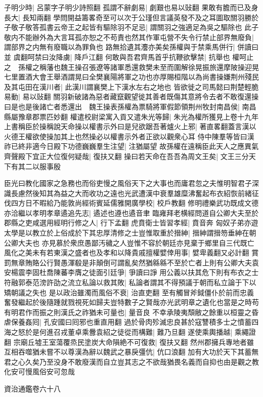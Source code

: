 子明少時|{
	呂蒙字子明少詩照翻}
孤謂不辭劇易|{
	劇艱也易以䜴翻}
果敢有膽而已及身長大|{
	長知兩翻}
學問開益籌畧奇至可以次于公瑾但言議英發不及之耳圖取關羽勝於子敬子敬答孤書云帝王之起皆有驅除羽不足忌|{
	謂關羽之強適足為吳之驅除也}
此子敬内不能辦外為大言耳孤亦恕之不苟責也然其作軍屯營不失令行禁止部界無廢負|{
	謂部界之内無有廢職以為罪負也}
路無拾遺其灋亦美矣孫權與于禁乘馬併行|{
	併讀曰並}
虞翻呵禁曰汝降虜|{
	降戶江翻}
何敢與吾君齊馬首乎抗鞭欲擊禁|{
	抗舉也}
權呵止之　孫權之稱藩也魏王操召張遼等諸軍悉還救樊未至而圍解徐晃振旅還摩陂操迎晃七里置酒大會王舉酒謂晃曰全樊襄陽將軍之功也亦厚賜桓階以為尚書操嫌荆州殘民及其屯田在漢川者|{
	此漢川謂襄樊上下漢水左右之地也}
皆欲徙之司馬懿曰荆楚輕脆易動|{
	易以䜴翻}
關羽新破諸為惡者藏竄觀望徙其善者既傷其意將令去者不敢復還操曰是也是後諸亡者悉還出　魏王操表孫權為票騎將軍假節領荆州牧封南昌侯|{
	南昌縣屬豫章郡票匹妙翻}
權遣校尉梁寓入貢又遣朱光等歸|{
	朱光為權所獲見上卷十九年}
上書稱臣於操稱說天命操以權書示外曰是兒欲踞吾著爐火上邪|{
	著直畧翻蓋言漢以火德王權欲使操加其上也然操必以權書示外者正欲以觀衆心耳}
侍中陳羣等皆曰漢祚已終非適今日殿下功德巍巍羣生注望|{
	注猶屬望}
故孫權在遠稱臣此天人之應異氣齊聲殿下宜正大位復何疑哉|{
	復扶又翻}
操曰若天命在吾吾為周文王矣|{
	文王三分天下有其二以服事殷}


臣光曰教化國家之急務也而俗吏慢之風俗天下之大事也而庸君忽之夫惟明智君子深識長慮然後知其為益之大而收功之遠也光武遭漢中衰羣雄糜沸奮起布衣紹恢前緒征伐四方日不暇給乃能敦尚經術賓延儒雅開廣學校|{
	校戶教翻}
修明禮樂武功既成文德亦洽繼以孝明孝章遹追先志|{
	遹述也遵也遹音聿}
臨雍拜老横經問道自公卿大夫至於郡縣之吏咸選用經明行修之人|{
	行下孟翻}
虎賁衛士皆習孝經|{
	賁音奔}
匈奴子弟亦遊太學是以教立於上俗成於下其忠厚清修之士豈惟取重於搢紳|{
	搢紳謂搢笏垂紳在朝公卿大夫也}
亦見慕於衆庶愚鄙汚穢之人豈惟不容於朝廷亦見棄于鄉里自三代既亡風化之美未有若東漢之盛者也及孝和以降貴戚擅權嬖倖用事|{
	嬖卑義翻又必計翻}
賞罰無章賄賂公行賢愚渾殽是非顛倒可謂亂矣然猶緜緜不至於亡者上則有公卿大夫袁安楊震李固杜喬陳蕃李膺之徒面引廷爭|{
	爭讀曰諍}
用公義以扶其危下則有布衣之士符融郭泰范滂許劭之流立私論以救其敗|{
	私論者謂其不得預議于朝而私立論于下以矯朝議之失也}
是以政治雖濁而風俗不衰|{
	治直吏翻}
至有觸冒斧鉞僵仆於前而忠義奮發繼起於後隨踵就戮視死如歸夫豈特數子之賢哉亦光武明章之遺化也當是之時苟有明君作而振之則漢氏之祚猶未可量也|{
	量音良}
不幸承陵夷頹敝之餘重以桓靈之昏虐保養姦囘|{
	孔安國曰囘邪也重直用翻}
過於骨肉殄滅忠良甚於寇讐積多士之憤蓄四海之怒於是何進召戎董卓乘釁袁紹之徒從而構難|{
	難乃旦翻}
遂使乘輿播越|{
	乘繩證翻}
宗廟丘墟王室蕩覆烝民塗炭大命隕絶不可復救|{
	復扶又翻}
然州郡擁兵專地者雖互相吞噬猶未嘗不以尊漢為辭以魏武之暴戾彊伉|{
	伉口浪翻}
加有大功於天下其蓄無君之心久矣乃至没身不敢廢漢而自立豈其志之不欲哉猶畏名義而自抑也由是觀之教化安可慢風俗安可忽哉

資治通鑑卷六十八

